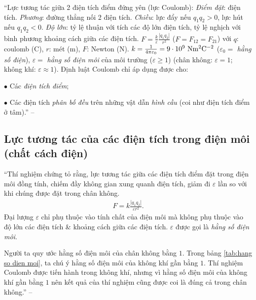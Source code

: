 \documentclass[oneside]{book}
\numberwithin{equation}{section}
\begin{document}
``Lực tương tác giữa 2 điện tích điểm đứng yên (lực Coulomb): \textit{Điểm đặt}: điện tích. \textit{Phương}: đường thẳng nối 2 điện tích. \textit{Chiều}: lực đẩy nếu $q_1q_2 > 0$, lực hút nếu $q_1q_2 < 0$. \textit{Độ lớn}: tỷ lệ thuận với tích các độ lớn điện tích, tỷ lệ nghịch với bình phương khoảng cách giữa các điện tích. $F = \frac{k}{\varepsilon}\frac{|q_1q_2|}{r^2}$ ($F = F_{12} = F_{21}$) với $q$: coulomb (C), $r$: mét (m), $F$: Newton (N). $k = \frac{1}{4\pi\varepsilon_0} = 9\cdot 10^9\ {\rm Nm^2C^{-2}}$ ($\varepsilon_0 =$ \textit{hằng số điện}), $\varepsilon =$ \textit{hằng số điện môi} của môi trường ($\varepsilon\ge 1$) (chân không: $\varepsilon = 1$; không khí: $\varepsilon\approx 1$). Định luật Coulomb chỉ áp dụng được cho:
\begin{enumerate*}
	\item[$\bullet$] Các \textit{điện tích điểm};
	\item[$\bullet$] Các điện tích \textit{phân bố đều} trên những vật dẫn \textit{hình cầu} (coi như điện tích điểm ở tâm).'' -- \cite[p. 5--6]{Giai_Toan_Vat_Ly_11_tap_1}
\end{enumerate*}

\subsection{Lực tương tác của các điện tích trong điện môi (chất cách điện)}
``Thí nghiệm chứng tỏ rằng, lực tương tác giữa các điện tích điểm đặt trong điện môi đồng tính, chiếm đầy không gian xung quanh điện tích, giảm đi $\varepsilon$ lần so với khi chúng được đặt trong chân không.
\begin{align}
	\label{luc tuong tac cua cac dien tich trong dien moi}
	F = k\frac{|q_1q_2|}{\varepsilon r^2}.
\end{align}
Đại lượng $\varepsilon$ chỉ phụ thuộc vào tính chất của điện môi mà không phụ thuộc vào độ lớn các điện tích \& khoảng cách giữa các điện tích. $\varepsilon$ được gọi là \textit{hằng số điện môi}.

Người ta quy ước hằng số điện môi của chân không bằng $1$. Trong bảng \ref{tab:hang so dien moi}, ta chú ý hằng số điện môi của không khí gần bằng $1$. Thí nghiệm Coulomb được tiến hành trong không khí, nhưng vì hằng số điện môi của không khí gần bằng $1$ nên kết quả của thí nghiệm cũng được coi là đúng cả trong chân không.'' -- \cite[p. 8]{SGK_Vat_Ly_11_nang_cao}
\end{document}
